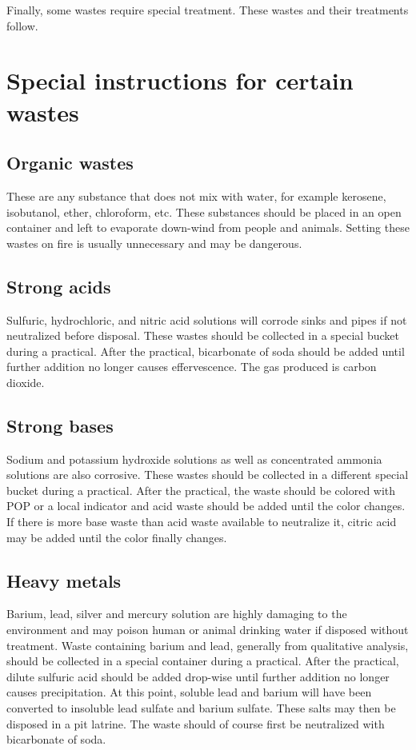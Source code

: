 Finally, some wastes require special treatment. 
These wastes and their treatments follow.

\section{Special instructions for certain wastes}
\subsection{Organic wastes}
These are any substance that does not mix with water, 
for example kerosene, isobutanol, ether, chloroform, etc. 
These substances should be placed in an open container 
and left to evaporate down-wind from people and animals. 
Setting these wastes on fire is usually unnecessary and may be dangerous.

\subsection{Strong acids}
Sulfuric, hydrochloric, and nitric acid solutions 
will corrode sinks and pipes if not neutralized before disposal. 
These wastes should be collected in a special bucket during a practical. 
After the practical, bicarbonate of soda should be added 
until further addition no longer causes effervescence. 
The gas produced is carbon dioxide.

\subsection{Strong bases}
Sodium and potassium hydroxide solutions 
as well as concentrated ammonia solutions are also corrosive. 
These wastes should be collected 
in a different special bucket during a practical. 
After the practical, the waste should be colored with POP 
or a local indicator and acid waste should be added until the color changes. 
If there is more base waste than acid waste available to neutralize it, 
citric acid may be added until the color finally changes.

\subsection{Heavy metals}
Barium, lead, silver and mercury solution 
are highly damaging to the environment 
and may poison human or animal drinking water if disposed without treatment. 
Waste containing barium and lead, generally from qualitative analysis, 
should be collected in a special container during a practical. 
After the practical, dilute sulfuric acid should be added drop-wise 
until further addition no longer causes precipitation. 
At this point, soluble lead and barium will have been converted 
to insoluble lead sulfate and barium sulfate. 
These salts may then be disposed in a pit latrine. 
The waste should of course first be neutralized with bicarbonate of soda.

